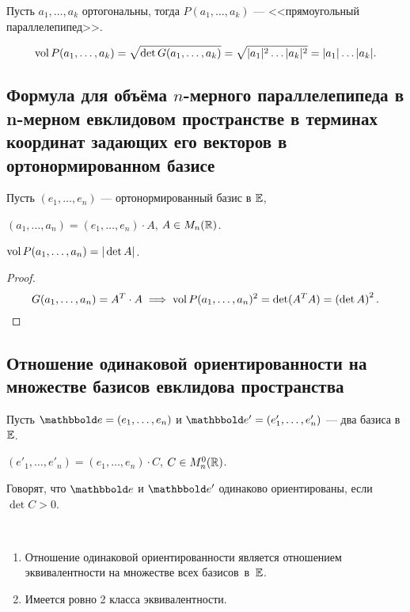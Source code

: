 \begin{example}
    Пусть $a_1, \dots, a_k$ ортогональны, тогда $P(a_1, \dots, a_k)$ --- <<прямоугольный параллелепипед>>.

    \begin{equation*}
        \operatorname{\mathop{\mathrm{vol}}} P(a_1, \dots, a_k) = \sqrt{\det G(a_1, \dots, a_k)} = \sqrt{|a_1|^2 \dots |a_k|^2} = |a_1| \dots |a_k|
    .\end{equation*}
\end{example}


\subsection{Формула для объёма $n$-мерного параллелепипеда в n-мерном евклидовом пространстве в терминах координат задающих его векторов в ортонормированном базисе}

Пусть $(e_1, \dots, e_n)$ --- ортонормированный базис в $\mathbb{E}$,

$(a_1, \dots, a_n) = (e_1, \dots, e_n) \cdot A$, $A \in M_n(\mathbb{R})$.

\begin{proposal}
    $\operatorname{\mathop{\mathrm{vol}}} P(a_1, \dots, a_n) = |\det A|$.
\end{proposal}

\begin{proof}
    \begin{equation*}
        G(a_1, \dots, a_n) = A^{T} \cdot A \implies \operatorname{\mathop{\mathrm{vol}}} P(a_1, \dots, a_n)^2 = \det (A^{T} A) = \left(\det A\right)^2
    .\end{equation*}
\end{proof}


\subsection{Отношение одинаковой ориентированности на множестве базисов евклидова пространства}

Пусть $\E = (e_1, \dots, e_n)$ и $\E' = (e'_1, \dots, e'_n)$ --- два базиса в $\mathbb{E}$.

$(e'_1, \dots, e'_n) = (e_1, \dots, e_n) \cdot C$, $C \in M_n^0(\mathbb{R})$.

\begin{definition}
    Говорят, что $\E$ и $\E'$ одинаково ориентированы, если $\det C > 0$.
\end{definition}

\begin{exercise}~
    \begin{enumerate}
    \item 
        Отношение одинаковой ориентированности является отношением эквивалентности на множестве всех базисов~в~$\mathbb{E}$.
    \item 
        Имеется ровно 2 класса эквивалентности.
    \end{enumerate}
\end{exercise}


